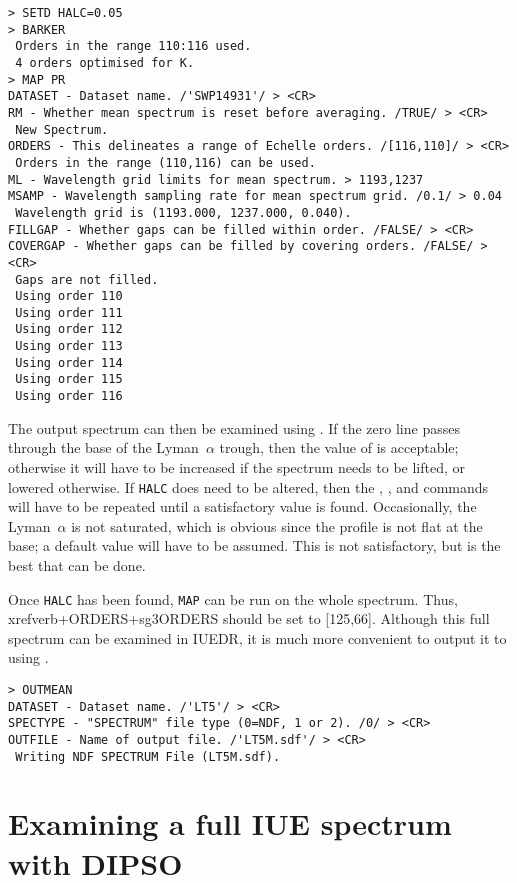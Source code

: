 \begin{verbatim}
> SETD HALC=0.05
> BARKER
 Orders in the range 110:116 used.
 4 orders optimised for K.
> MAP PR
DATASET - Dataset name. /'SWP14931'/ > <CR>
RM - Whether mean spectrum is reset before averaging. /TRUE/ > <CR>
 New Spectrum.
ORDERS - This delineates a range of Echelle orders. /[116,110]/ > <CR>
 Orders in the range (110,116) can be used.
ML - Wavelength grid limits for mean spectrum. > 1193,1237
MSAMP - Wavelength sampling rate for mean spectrum grid. /0.1/ > 0.04
 Wavelength grid is (1193.000, 1237.000, 0.040).
FILLGAP - Whether gaps can be filled within order. /FALSE/ > <CR>
COVERGAP - Whether gaps can be filled by covering orders. /FALSE/ > <CR>
 Gaps are not filled.
 Using order 110
 Using order 111
 Using order 112
 Using order 113
 Using order 114
 Using order 115
 Using order 116
\end{verbatim}

The output spectrum can then be examined using
\@.  If the zero
line passes through the base of the Lyman~$\alpha$ trough, then the value of
 is acceptable; otherwise it will have to be
increased if the
spectrum needs to be lifted, or lowered otherwise.  If \verb+HALC+ does need
to be altered, then the ,
, and 
commands will have to be repeated until a satisfactory value is found.
Occasionally, the Lyman~$\alpha$ is not saturated, which is obvious since the
profile is not flat at the base; a default value will have to be assumed.  This
is not satisfactory, but is the best that can be done.

Once \verb+HALC+ has been found, \verb+MAP+ can be run on the whole spectrum.
Thus, \\xref{verb+ORDERS+}{sg3}{ORDERS} should be set to [125,66]\@.
Although this full spectrum
can be examined in IUEDR, it is much more convenient to output it to
using \@.

\begin{verbatim}
> OUTMEAN
DATASET - Dataset name. /'LT5'/ > <CR>
SPECTYPE - "SPECTRUM" file type (0=NDF, 1 or 2). /0/ > <CR>
OUTFILE - Name of output file. /'LT5M.sdf'/ > <CR>
 Writing NDF SPECTRUM File (LT5M.sdf).
\end{verbatim}

\section{Examining a full IUE spectrum with DIPSO}

